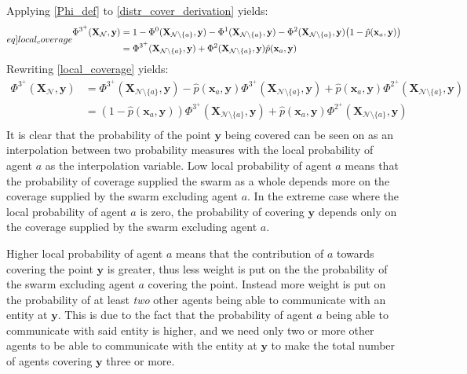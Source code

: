 Applying \eqref{Phi_def} to \eqref{distr_cover_derivation} yields:
\begin{equation}\label[eq]{local_coverage}
  \begin{split}
    \Phi^{3^{+}}(\mathbf{X}_{\mathcal{N}}, \mathbf{y}) &= 1 - \Phi^{0}(\mathbf{X}_{\mathcal{N}\setminus\{a\}}, \mathbf{y}) - \Phi^{1}(\mathbf{X}_{\mathcal{N}\setminus\{a\}}, \mathbf{y}) - \Phi^{2}(\mathbf{X}_{\mathcal{N}\setminus\{a\}}, \mathbf{y})\big(1-\hat{p}(\mathbf{x}_{a}, \mathbf{y})\big)\\
    &= \Phi^{3^{+}}(\mathbf{X}_{\mathcal{N}\setminus\{a\}}, \mathbf{y}) + \Phi^{2}(\mathbf{X}_{\mathcal{N}\setminus\{a\}}, \mathbf{y})\hat{p}(\mathbf{x}_{a}, \mathbf{y})\\
  \end{split}
\end{equation}
Rewriting \eqref{local_coverage} yields:
\begin{equation}
  \begin{split}
    \Phi^{3^{+}}(\mathbf{X}_{\mathcal{N}}, \mathbf{y}) &= \Phi^{3^{+}}(\mathbf{X}_{\mathcal{N}\setminus\{a\}}, \mathbf{y}) - \hat{p}(\mathbf{x}_{a}, \mathbf{y})\Phi^{3^{+}}(\mathbf{X}_{\mathcal{N}\setminus\{a\}}, \mathbf{y}) + \hat{p}(\mathbf{x}_{a}, \mathbf{y})\Phi^{2^{+}}(\mathbf{X}_{\mathcal{N}\setminus\{a\}}, \mathbf{y})\\
    &= (1-\hat{p}(\mathbf{x}_{a}, \mathbf{y}))\Phi^{3^{+}}(\mathbf{X}_{\mathcal{N}\setminus\{a\}}, \mathbf{y}) + \hat{p}(\mathbf{x}_{a}, \mathbf{y})\Phi^{2^{+}}(\mathbf{X}_{\mathcal{N}\setminus\{a\}}, \mathbf{y})\\
  \end{split}
\end{equation}
It is clear that the probability of the point $\mathbf{y}$ being covered can be seen on as an interpolation between two probability measures with the local probability of agent $a$ as the interpolation variable. Low local probability of agent $a$ means that the probability of coverage supplied the swarm as a whole depends more on the coverage supplied by
the swarm excluding agent $a$. In the extreme case where the local probability of agent $a$ is zero, the probability of covering $\mathbf{y}$ depends only on the coverage supplied by the swarm excluding agent $a$.

Higher local probability of agent $a$ means that the contribution of $a$ towards covering the point $\mathbf{y}$ is greater, thus less weight is put on the the probability of the swarm excluding agent $a$ covering the point. Instead more weight is put on the probability of at least \textit{two} other agents being able to communicate with an entity at $\mathbf{y}$. 
This is due to the fact that the probability of agent $a$ being able to communicate with said entity is higher, and we need only two or more other agents to be able to communicate with the entity at $\mathbf{y}$ to make the total number of agents covering $\mathbf{y}$ three or more.

